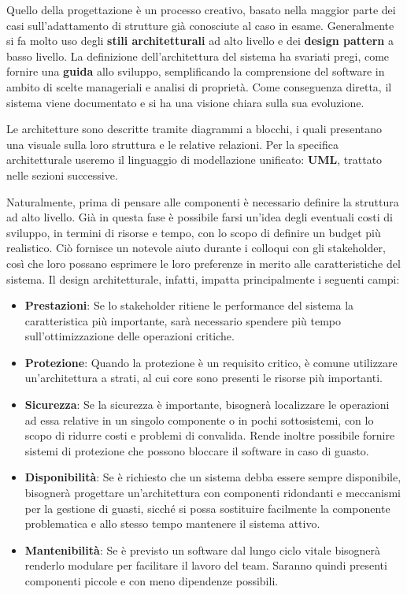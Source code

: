 \noindent Quello della progettazione è un processo creativo, basato nella maggior parte dei casi sull'adattamento di strutture già conosciute al caso
in esame. Generalmente si fa molto uso degli \textbf{stili architetturali} ad alto livello e dei \textbf{design pattern} a basso livello. La definizione
dell'architettura del sistema ha svariati pregi, come fornire una \textbf{guida} allo sviluppo, semplificando la comprensione del software in ambito di
scelte manageriali e analisi di proprietà. Come conseguenza diretta, il sistema viene documentato e si ha una visione chiara sulla sua evoluzione.\par
Le architetture sono descritte tramite diagrammi a blocchi, i quali presentano una visuale sulla loro struttura e le relative relazioni. Per la
specifica architetturale useremo il linguaggio di modellazione unificato: \textbf{UML}, trattato nelle sezioni successive.\par
Naturalmente, prima di pensare alle componenti è necessario definire la struttura ad alto livello. Già in questa fase è possibile farsi un'idea degli
eventuali costi di sviluppo, in termini di risorse e tempo, con lo scopo di definire un budget più realistico. Ciò fornisce un notevole aiuto durante i
colloqui con gli stakeholder, così che loro possano esprimere le loro preferenze in merito alle caratteristiche del sistema. Il design architetturale,
infatti, impatta principalmente i seguenti campi: \begin{itemize}
	\item \textbf{Prestazioni}: Se lo stakeholder ritiene le performance del sistema la caratteristica più importante, sarà necessario spendere più
	tempo sull'ottimizzazione delle operazioni critiche.
	\item \textbf{Protezione}: Quando la protezione è un requisito critico, è comune utilizzare un'architettura a strati, al cui core sono presenti le
	risorse più importanti.
	\item \textbf{Sicurezza}: Se la sicurezza è importante, bisognerà localizzare le operazioni ad essa relative in un singolo componente o in pochi
	sottosistemi, con lo scopo di ridurre costi e problemi di convalida. Rende inoltre possibile fornire sistemi di protezione che possono bloccare il
	software in caso di guasto.
	\item \textbf{Disponibilità}: Se è richiesto che un sistema debba essere sempre disponibile, bisognerà progettare un'architettura con componenti
	ridondanti e meccanismi per la gestione di guasti, sicché si possa sostituire facilmente la componente problematica e allo stesso tempo mantenere
	il sistema attivo.
	\item \textbf{Mantenibilità}: Se è previsto un software dal lungo ciclo vitale bisognerà renderlo modulare per facilitare il lavoro del team.
	Saranno quindi presenti componenti piccole e con meno dipendenze possibili.
\end{itemize}


